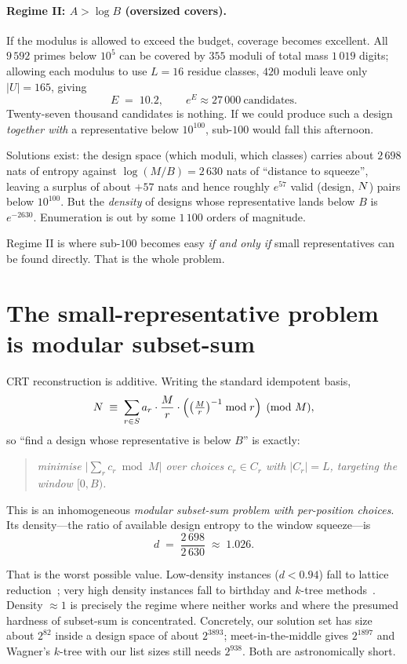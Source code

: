 \paragraph{Regime II: $A>\log B$ (oversized covers).} If the modulus is allowed
to exceed the budget, coverage becomes excellent. All $9\,592$ primes below
$10^{5}$ can be covered by $355$ moduli of total mass $1\,019$ digits; allowing
each modulus to use $L=16$ residue classes, $420$ moduli leave only $|U|=165$,
giving
\[
E\;=\;10.2,\qquad e^{E}\approx27\,000\ \text{candidates}.
\]
Twenty-seven thousand candidates is nothing. If we could produce such a design
\emph{together with} a representative below $10^{100}$, sub-$100$ would fall
this afternoon.

Solutions exist: the design space (which moduli, which classes) carries about
$2\,698$ nats of entropy against $\log(M/B)=2\,630$ nats of ``distance to
squeeze'', leaving a surplus of about $+57$ nats and hence roughly $e^{57}$
valid (design, $N$) pairs below $10^{100}$. But the \emph{density} of designs
whose representative lands below $B$ is $e^{-2630}$. Enumeration is out by some
$1\,100$ orders of magnitude.

\begin{observation}
Regime II is where sub-$100$ becomes easy \emph{if and only if} small
representatives can be found directly. That is the whole problem.
\end{observation}

\section{The small-representative problem is modular subset-sum}

CRT reconstruction is additive. Writing the standard idempotent basis,
\[
N\;\equiv\;\sum_{r\in S}a_r\cdot\frac{M}{r}\cdot\Bigl(\bigl(\tfrac{M}{r}\bigr)^{-1}\bmod r\Bigr)
\pmod M ,
\]
so ``find a design whose representative is below $B$'' is exactly:
\begin{quote}\itshape
minimise $\bigl|\sum_r c_r \bmod M\bigr|$ over choices $c_r\in C_r$ with
$|C_r|=L$, targeting the window $[0,B)$.
\end{quote}
This is an inhomogeneous \emph{modular subset-sum problem with per-position
choices}. Its density---the ratio of available design entropy to the window
squeeze---is
\[
d\;=\;\frac{2\,698}{2\,630}\;\approx\;1.026 .
\]

That is the worst possible value. Low-density instances ($d<0.94$) fall to
lattice reduction~\cite{LagariasOdlyzko,Coster}; very high density instances
fall to birthday and $k$-tree methods~\cite{Wagner}. Density $\approx1$ is
precisely the regime where neither works and where the presumed hardness of
subset-sum is concentrated. Concretely, our solution set has size about
$2^{82}$ inside a design space of about $2^{3893}$; meet-in-the-middle gives
$2^{1897}$ and Wagner's $k$-tree with our list sizes still needs $2^{938}$.
Both are astronomically short.


